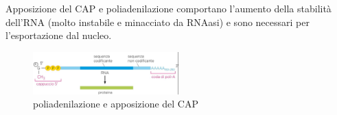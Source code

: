         \vspace{0.5cm}
        Apposizione del CAP e poliadenilazione comportano l'aumento della stabilità dell'RNA (molto instabile e minacciato da RNAasi) e sono necessari per l'esportazione dal nucleo.\\
            
            \begin{figure}[h]
                \centering
                \includegraphics[width=0.5\textwidth]{images/poliAeCap.JPG}
                \caption{\small poliadenilazione e apposizione del CAP}
                \label{fig:mesh1}
            \end{figure}
            
